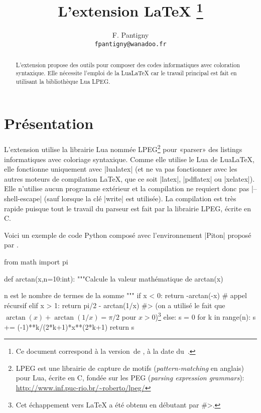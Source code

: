 \documentclass[dvipsnames,svgnames]{article}
\begin{document}
\VerbatimFootnotes


\title{L'extension LaTeX \thanks{Ce document correspond à la 
version~\PitonFileVersion\space de , à la date du~\PitonFileDate.}} 
\author{F. Pantigny \\ \texttt{fpantigny@wanadoo.fr}}

\maketitle

\begin{abstract}
L'extension  propose des outils pour composer des codes informatiques avec
coloration syntaxique. Elle nécessite l'emploi de la LuaLaTeX car le travail principal est
fait en utilisant la bibliothèque Lua LPEG.
\end{abstract}


\section{Présentation}

L'extension  utilise la librairie Lua nommée LPEG\footnote{LPEG est une
  librairie de capture de motifs (\emph{pattern-matching} en anglais) pour Lua, écrite en
  C, fondée sur les PEG (\emph{parsing expression grammars}):
  \url{http://www.inf.puc-rio.br/~roberto/lpeg/}} pour «parser» des listings informatiques
avec coloriage syntaxique. Comme elle utilise le Lua de LuaLaTeX, elle fonctionne
uniquement avec |lualatex| (et ne va pas fonctionner avec les autres moteurs de
compilation LaTeX, que ce soit |latex|, |pdflatex| ou |xelatex|). Elle n'utilise aucun
programme extérieur et la compilation ne requiert donc pas |--shell-escape| (sauf lorsque
la clé |write| est utilisée). La compilation est très rapide puisque tout le travail du
parseur est fait par la librairie LPEG, écrite en C.

\medskip
Voici un exemple de code Python composé avec l'environnement |{Piton}| proposé par .


\medskip
\begin{Piton}
from math import pi

def arctan(x,n=10:int):
    """Calcule la valeur mathématique de arctan(x)

    n est le nombre de termes de la somme
    """
    if x < 0:
        return -arctan(-x) # appel récursif
    elif x > 1: 
        return pi/2 - arctan(1/x) 
        #> (on a utilisé le fait que $\arctan(x)+\arctan(1/x)=\pi/2$ pour $x>0$)\footnote{Cet échappement vers LaTeX a été obtenu en débutant par \ttfamily\#>.} 
    else: 
        s = 0
        for k in range(n):
            s += (-1)**k/(2*k+1)*x**(2*k+1)
        return s 
\end{Piton}
\end{document}
